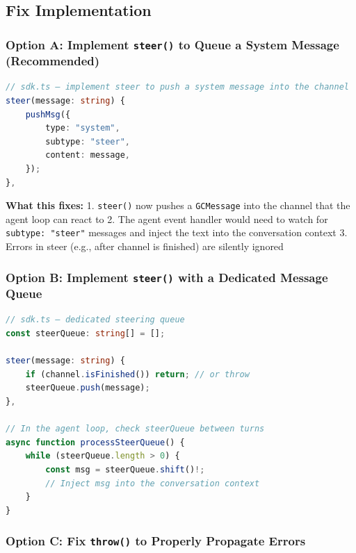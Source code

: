 \subsection*{Fix Implementation}
\subsubsection*{Option A: Implement \texttt{steer()} to Queue a System Message (Recommended)}



\begin{lstlisting}[language=TypeScript]
// sdk.ts — implement steer to push a system message into the channel
steer(message: string) {
    pushMsg({
        type: "system",
        subtype: "steer",
        content: message,
    });
},

\end{lstlisting}



\textbf{What this fixes:}
1. \texttt{steer()} now pushes a \texttt{GCMessage} into the channel that the agent loop can react to
2. The agent event handler would need to watch for \texttt{subtype: "steer"} messages and inject the text into the conversation context
3. Errors in steer (e.g., after channel is finished) are silently ignored

\subsubsection*{Option B: Implement \texttt{steer()} with a Dedicated Message Queue}



\begin{lstlisting}[language=TypeScript]
// sdk.ts — dedicated steering queue
const steerQueue: string[] = [];

steer(message: string) {
    if (channel.isFinished()) return; // or throw
    steerQueue.push(message);
},

// In the agent loop, check steerQueue between turns
async function processSteerQueue() {
    while (steerQueue.length > 0) {
        const msg = steerQueue.shift()!;
        // Inject msg into the conversation context
    }
}

\end{lstlisting}



\subsubsection*{Option C: Fix \texttt{throw()} to Properly Propagate Errors}




